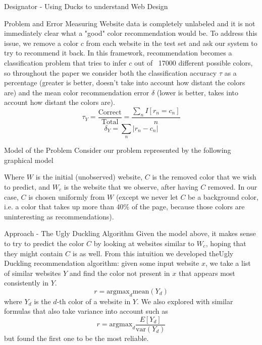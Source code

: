 \documentclass{beamer}
\begin{document}
\begin{frame}{\centerline{\Huge Designator - Using Ducks to understand Web Design}}
\begin{textblock}{5}
\begin{block}{Problem and Error Measuring}
Website data is completely unlabeled and it is not immediately clear what a "good" color recommendation would be. To address this issue, we remove a color $c$ from each website in the test set and ask our system to try to recommend it back. In this framework, recommendation becomes a classification problem that tries to infer $c$ out of ~17000 different possible colors, so throughout the paper we consider both the classification accuracy $\tau$ as a percentage (greater is better, doesn't take into account how distant the colors are) and the mean color recommendation error $\delta$ (lower is better, takes into account how distant the colors are).
$$\tau_Y = \frac{\text{Correct}}{\text{Total}} = \frac{\sum_n I[r_n = c_n]}{n}$$
$$\delta_Y = \sum_n |r_n - c_n|$$
\end{block}

\begin{block}{Model of the Problem}
Consider our problem represented by the following graphical model
\begin{figure}
\centering
{}
\end{figure}
Where $W$ is the initial (unobserved) website, $C$ is the removed color that we wish to predict, and $W_c$ is the website
that we observe, after having $C$ removed. In our case, $C$ is chosen uniformly from $W$ (except we never let $C$ be a
background color, i.e. a color that takes up more than 40\% of the page, because those colors are uninteresting as
recommendations).
\end{block}


\begin{block}{Approach - The Ugly Duckling Algorithm}
Given the model above, it makes sense to try to predict the color $C$ by looking at websites similar to $W_c$, hoping
that they might contain $C$ is as well. From this intuition we developed theUgly Duckling recommendation algorithm: given some input website $x$, we take a list of similar websites $Y$ and find the color not present in $x$ that appears most consistently in $Y$.
$$r = \text{argmax}_{d} \text{mean}(Y_d) $$
where $Y_d$ is the $d$-th color of a website in $Y$. We also explored with similar formulas that also take variance into account such as
$$r = \text{argmax}_{d} \frac{E\left[Y_d\right]}{\text{var}(Y_d)} $$
but found the first one to be the most reliable.


\end{block}
\end{textblock}
\end{frame}
\end{document}
